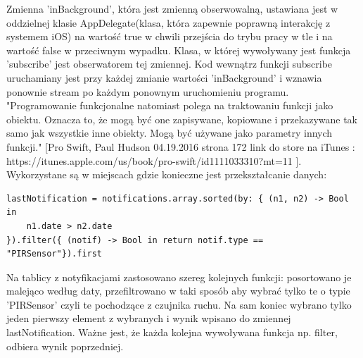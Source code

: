 Zmienna 'inBackground', która jest zmienną obserwowalną, ustawiana jest w oddzielnej klasie AppDelegate(klasa, która zapewnie poprawną interakcję z systemem iOS) na wartość true w chwili przejścia do trybu pracy w tle i na wartość false w przeciwnym wypadku. Klasa, w której wywoływany jest funkcja 'subscribe' jest obserwatorem tej zmiennej. Kod wewnątrz funkcji subscribe uruchamiany jest przy każdej zmianie wartości 'inBackground' i wznawia ponownie stream po każdym ponownym uruchomieniu programu.
"Programowanie funkcjonalne natomiast polega na traktowaniu funkcji jako obiektu. Oznacza to, że mogą być one zapisywane, kopiowane i przekazywane tak samo jak wszystkie inne obiekty. Mogą być używane jako parametry innych funkcji." [Pro Swift, Paul Hudson 04.19.2016 strona 172 link do store na iTunes : https://itunes.apple.com/us/book/pro-swift/id1111033310?mt=11 ]. Wykorzystane są w miejscach gdzie konieczne jest przekształcanie danych:
\begin{verbatim}
lastNotification = notifications.array.sorted(by: { (n1, n2) -> Bool in
	n1.date > n2.date 
}).filter({ (notif) -> Bool in return notif.type == "PIRSensor"}).first
\end{verbatim}
Na tablicy z notyfikacjami zastosowano szereg kolejnych funkcji: posortowano je malejąco według daty, przefiltrowano w taki sposób aby wybrać tylko te o typie 'PIRSensor' czyli te pochodzące z czujnika ruchu. Na sam koniec wybrano tylko jeden pierwszy element z wybranych i wynik wpisano do zmiennej lastNotification. Ważne jest, że każda kolejna wywoływana funkcja np. filter, odbiera wynik poprzedniej. 

